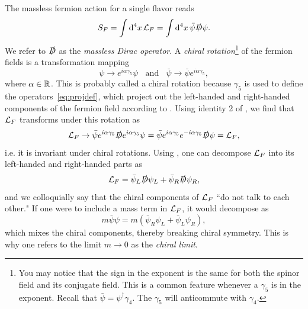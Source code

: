 The massless fermion action for a single flavor reads
\begin{equation}
S_F=\int\dd[4]{x}\mathcal{L}_F=\int\dd[4]{x}\bar{\psi}\slashed{D}\psi. 
\end{equation}
We refer to $\slashed{D}$ as the {\it massless Dirac operator}. A
{\it chiral rotation}\footnote{You may notice that the sign in the exponent
is the same for both the spinor field and its conjugate field. This is a
common feature whenever a $\gamma_5$ is in the exponent. Recall that
$\bar{\psi}=\psi^\dagger\gamma_4$. The $\gamma_5$ will anticommute with
$\gamma_4$.} of the fermion fields is a transformation
mapping
\begin{equation}
  \psi\to e^{i\alpha\gamma_5}\psi~~~~\text{and}~~~~
  \bar{\psi}\to\bar\psi e^{i\alpha\gamma_5},
\end{equation}
where $\alpha\in\mathbb{R}$. This is probably called a chiral rotation
because $\gamma_5$ is used to define the operators~\eqref{eq:projdef},
which project out the left-handed and right-handed components of the
fermion field according to . Using identity 2 of
, we find that $\mathcal{L}_F$ transforms under this
rotation as
\begin{equation}
  \mathcal{L}_F\to\bar{\psi}e^{i\alpha\gamma_5}\slashed{D}e^{i\alpha\gamma_5}\psi
         =\bar{\psi}e^{i\alpha\gamma_5}e^{-i\alpha\gamma_5}\slashed{D}\psi
         =\mathcal{L}_F,
\end{equation}
i.e. it is invariant under chiral rotations. Using
, one can decompose $\mathcal{L}_F$ into its
left-handed and right-handed parts as
\begin{equation}
  \mathcal{L}_F=\bar{\psi}_L\slashed{D}\psi_L
         +\bar{\psi}_R\slashed{D}\psi_R,
\end{equation}
and we colloquially say that the chiral components of
$\mathcal{L}_F$ ``do not talk to each other."
If one were to include a mass term in $\mathcal{L}_F$, it would decompose as
\begin{equation}
  m\bar{\psi}\psi=m\left(\bar{\psi}_R\psi_L+\bar{\psi}_L\psi_R\right),
\end{equation}
which mixes the chiral components, thereby breaking chiral symmetry.
This is why one refers to the limit $m\to0$ as the {\it chiral limit}.




